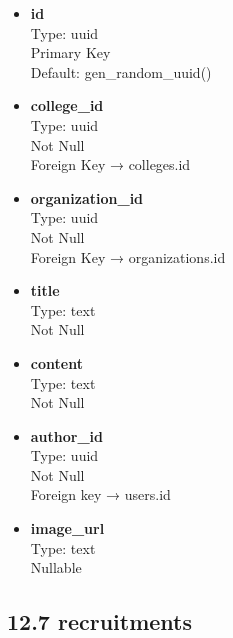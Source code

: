 \documentclass[12pt]{article}
\begin{document}
\begin{itemize}
    \item \textbf{id} \\
    Type: uuid \\
    Primary Key \\
    Default: gen\_random\_uuid()

    \item \textbf{college\_id} \\
    Type: uuid \\
    Not Null \\
    Foreign Key → colleges.id

    \item \textbf{organization\_id} \\
    Type: uuid \\
    Not Null \\
    Foreign Key → organizations.id

    \item \textbf{title} \\
    Type: text \\
    Not Null

    \item \textbf{content} \\
    Type: text \\
    Not Null

    \item \textbf{author\_id} \\
    Type: uuid \\
    Not Null \\ 
    Foreign key → users.id

    \item \textbf{image\_url} \\
    Type: text \\
    Nullable
\end{itemize}

\subsection*{12.7 recruitments}
\end{document}
